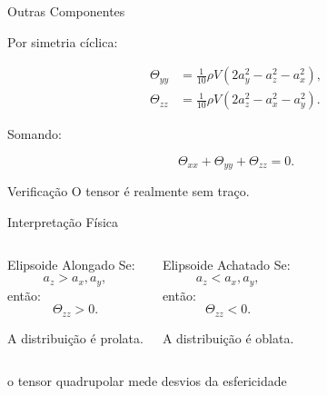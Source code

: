 \documentclass[aspectratio=169]{beamer}
\begin{document}
\begin{frame}{Outras Componentes}

\small

Por simetria cíclica:

\begin{eqbox}
\begin{align}
\Theta_{yy}
&=
\frac1{10}
\rho V
\left(
2a_y^2-a_z^2-a_x^2
\right),
\tag{4.79}
\\[0.3cm]
\Theta_{zz}
&=
\frac1{10}
\rho V
\left(
2a_z^2-a_x^2-a_y^2
\right).
\tag{4.80}
\end{align}
\end{eqbox}

\vspace{0.3cm}

Somando:

\[
\Theta_{xx}
+
\Theta_{yy}
+
\Theta_{zz}
=
0.
\]

\begin{alertblock}{Verificação}
O tensor é realmente sem traço.
\end{alertblock}

\end{frame}

\begin{frame}{Interpretação Física}

\small

\begin{columns}[T]


\begin{mybox}{Elipsoide Alongado}
Se:
\[
a_z>a_x,a_y,
\]
então:
\[
\Theta_{zz}>0.
\]

A distribuição é prolata.
\end{mybox}


\begin{mybox}{Elipsoide Achatado}
Se:
\[
a_z<a_x,a_y,
\]
então:
\[
\Theta_{zz}<0.
\]

A distribuição é oblata.
\end{mybox}

\end{columns}

\vspace{0.5cm}

\begin{center}

\Large
o tensor quadrupolar mede desvios da esfericidade

\end{center}

\end{frame}
\end{document}

